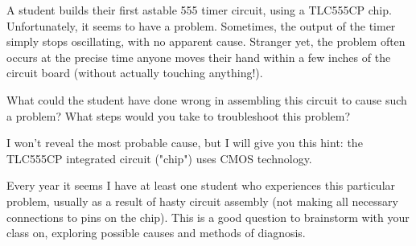 

A student builds their first astable 555 timer circuit, using a TLC555CP chip.  Unfortunately, it seems to have a problem.  Sometimes, the output of the timer simply stops oscillating, with no apparent cause.  Stranger yet, the problem often occurs at the precise time anyone moves their hand within a few inches of the circuit board (without actually touching anything!).

What could the student have done wrong in assembling this circuit to cause such a problem?  What steps would you take to troubleshoot this problem?







I won't reveal the most probable cause, but I will give you this hint: the TLC555CP integrated circuit ("chip") uses CMOS technology.







Every year it seems I have at least one student who experiences this particular problem, usually as a result of hasty circuit assembly (not making all necessary connections to pins on the chip).  This is a good question to brainstorm with your class on, exploring possible causes and methods of diagnosis.




